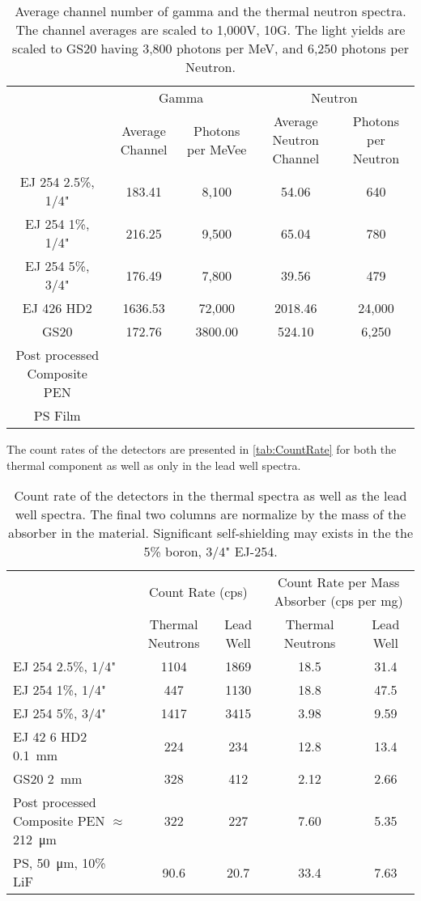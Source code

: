 \documentclass[onecolumn]{IEEEtran}
\begin{document}
\begin{table}
  \centering
  \caption[Average Channel Number of Gamma and Neutron Spectra]{Average channel number of gamma and the thermal neutron spectra.  The channel averages are scaled to 1,000V, 10G. The light yields are scaled to GS20 having 3,800 photons per MeV, and 6,250 photons per Neutron.}
  \label{tab:AvgChNG}
  \begin{tabular}{c| c c |c c}
    \toprule
        &\multicolumn{2}{|c|}{Gamma}&\multicolumn{2}{|c}{Neutron}\\
        & Average Channel& Photons per MeVee & Average Neutron Channel & Photons per Neutron\\
    \midrule
    EJ 254 2.5\%, 1/4"&	183.41	&	8,100	&	54.06	&	640	\\
    EJ 254 1\%, 1/4"&	216.25	&	9,500	&	65.04	&	780	\\
    EJ 254 5\%, 3/4"&	176.49	&	7,800	&	39.56	&	479	\\
    EJ 426 HD2&	1636.53	&	72,000	&	2018.46	&	24,000	\\
    GS20 &	172.76	&	3800.00	&	524.10	&	6,250	\\
    Post processed Composite PEN&	&		&		&		\\
    PS Film & & & & \\
    \bottomrule
  \end{tabular}
\end{table}
The count rates of the detectors are presented in \autoref{tab:CountRate} for both the thermal component as well as only in the lead well spectra.
\begin{table}
\centering
  \caption[Detector Count Rate]{Count rate of the detectors in the thermal spectra as well as the lead well spectra.  The final two columns are normalize by the mass of the absorber in the material. Significant self-shielding may exists in the the 5\% boron, 3/4" EJ-254.}
  \label{tab:CountRate}
  \begin{tabular}{p{2cm} | c c| c c}
  \toprule
    &\multicolumn{2}{|c|}{Count Rate (cps)}&\multicolumn{2}{|c}{Count Rate per Mass Absorber (cps per mg)} \\
    & Thermal Neutrons &Lead Well & Thermal Neutrons & Lead Well\\
  \midrule
  EJ 254 2.5\%, 1/4"&	1104	&	1869	&	18.5	&	31.4	\\
  EJ 254 1\%, 1/4"&	447	&	1130	&	18.8	&	47.5	\\
  EJ 254 5\%, 3/4"&	1417	&	3415	&	3.98	&	9.59	\\
  EJ 42 6 HD2 \SI{0.1}{\mm}&	224	&	234	&	12.8	&	13.4	\\
  GS20 \SI{2}{\mm}&	328	&	412	&	2.12	&	2.66	\\
  Post processed Composite PEN $\approx$ \SI{212}{\um}&	322	&	227	&	7.60	&	5.35	\\
  PS, \SI{50}{\um}, 10\% LiF & 90.6 & 20.7 & 33.4 & 7.63 \\
  \bottomrule
  \end{tabular}
\end{table}
\end{document}
